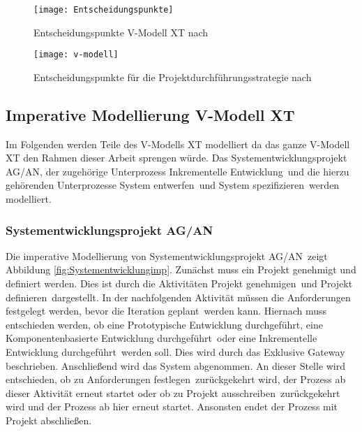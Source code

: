  
 
 \begin{figure}[!htbp]
\begin{center}
  \texttt{[image: Entscheidungspunkte]} %
  \caption{Entscheidungspunkte V-Modell XT nach \cite{2004vmodell}}
  \label{fig:entscheidungspunkte}
\end{center}
\end{figure}
 
\begin{sidewaysfigure}[!htbp]
\begin{center}
  \texttt{[image: v-modell]} %
  \caption{Entscheidungspunkte für die Projektdurchführungsstrategie nach \cite{2004vmodell}}
  \label{fig:v-modell}
\end{center}
\end{sidewaysfigure}


\clearpage

\subsection{Imperative Modellierung V-Modell XT}

Im Folgenden werden Teile des V-Modells XT modelliert da das ganze V-Modell XT den Rahmen dieser Arbeit sprengen würde. Das \grqq Systementwicklungsprojekt AG/AN\grqq, der zugehörige Unterprozess \grqq Inkrementelle Entwicklung\grqq \ und die hierzu gehörenden Unterprozesse \grqq System entwerfen\grqq \ und \grqq System spezifizieren\grqq \  werden modelliert.

\subsubsection{Systementwicklungsprojekt AG/AN}


Die imperative Modellierung von \grqq Systementwicklungsprojekt AG/AN\grqq \ zeigt Abbildung \ref{fig:Systementwicklungimp}. 
Zunächst muss ein Projekt genehmigt und definiert werden. Dies ist durch die Aktivitäten \grqq Projekt genehmigen\grqq \ und \grqq Projekt definieren\grqq \ dargestellt.
In der nachfolgenden Aktivität müssen die \grqq Anforderungen festgelegt werden\grqq, bevor die \grqq Iteration geplant\grqq \ werden kann. 
Hiernach muss entschieden werden, ob eine \grqq Prototypische Entwicklung durchgeführt\grqq, eine \grqq Komponentenbasierte Entwicklung durchgeführt\grqq \ oder eine \grqq Inkrementelle Entwicklung durchgeführt\grqq \ werden soll. Dies wird durch das Exklusive Gateway beschrieben.
Anschließend wird das \grqq System abgenommen\grqq. An dieser Stelle wird entschieden, ob zu \grqq Anforderungen festlegen\grqq \ zurückgekehrt wird, der Prozess ab dieser Aktivität erneut startet oder ob zu \grqq Projekt ausschreiben\grqq \ zurückgekehrt wird und der Prozess ab hier erneut startet. Ansonsten endet der Prozess mit \grqq Projekt abschließen\grqq.

